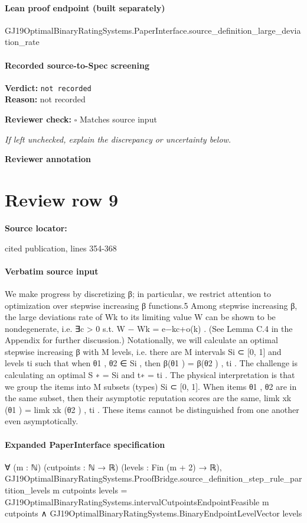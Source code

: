 \documentclass[10pt]{article}
\newcommand{\reviewerbox}{%
  \par\noindent\fbox{\parbox{0.96\linewidth}{\rule{0pt}{0.38in}}}\par
}
\newcommand{\reviewmatch}[1]{%
  \par\noindent\textbf{Reviewer check:} $\square$\; #1\par
  \noindent\emph{If left unchecked, explain the discrepancy or uncertainty below.}\par
}
\begin{document}
\paragraph{Lean proof endpoint (built separately)}\begin{ReviewVerbatim}
GJ19OptimalBinaryRatingSystems.PaperInterface.source_definition_large_deviation_rate
\end{ReviewVerbatim}

\paragraph{Recorded source-to-Spec screening}
\textbf{Verdict:} \texttt{not recorded}
\\
\textbf{Reason:} not recorded
\reviewmatch{Matches source input}
\noindent\textbf{Reviewer annotation}\par
\reviewerbox
\clearpage
\hypertarget{source-claim-9c0b6bf527ad55ca}{}
\section*{Review row 9}
\textbf{Source locator:} {\footnotesize\raggedright cited publication, lines 354-\allowbreak{}368\par}
\paragraph{Verbatim source input}
\begin{ReviewVerbatim}
We make progress by discretizing β; in particular,
we restrict attention to optimization over stepwise
increasing β functions.5 Among stepwise increasing
β, the large deviations rate of Wk to its limiting
value W can be shown to be nondegenerate, i.e. ∃c >
0 s.t. W − Wk = e−kc+o(k) . (See Lemma C.4 in the
Appendix for further discussion.)
Notationally, we will calculate an optimal stepwise
increasing β with M levels, i.e. there are M intervals
Si ⊂ [0, 1] and levels ti such that when θ1 , θ2 ∈ Si ,
then β(θ1 ) = β(θ2 ) , ti . The challenge is calculating an optimal S ∗ = {Si } and t∗ = {ti }.
The physical interpretation is that we group the
items into M subsets (types) Si ⊂ [0, 1]. When
items θ1 , θ2 are in the same subset, then their asymptotic reputation scores are the same, limk xk (θ1 ) =
limk xk (θ2 ) , ti . These items cannot be distinguished from one another even asymptotically.
\end{ReviewVerbatim}


\paragraph{Expanded PaperInterface specification}
\begin{ReviewVerbatim}
∀ (m : ℕ) (cutpoints : ℕ → ℝ) (levels : Fin (m + 2) → ℝ),
  GJ19OptimalBinaryRatingSystems.ProofBridge.source_definition_step_rule_partition_levels m cutpoints levels =
      GJ19OptimalBinaryRatingSystems.intervalCutpointsEndpointFeasible m cutpoints ∧
    GJ19OptimalBinaryRatingSystems.BinaryEndpointLevelVector levels
\end{ReviewVerbatim}
\end{document}
